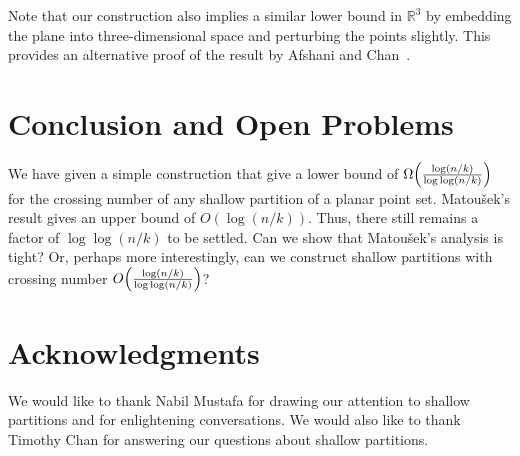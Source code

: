\documentclass{paper}
\newcommand\R{{\mathbb R}}
\newcommand\matousek{{Matou{\v{s}}ek}}
\begin{document}
Note that our construction also implies a similar lower bound in $\R^3$
by embedding the plane into three-dimensional space and perturbing
the points slightly. This provides an alternative proof of the result
by Afshani and Chan~\cite{AfshaniCh09}.

\section{Conclusion and Open Problems}

We have given a simple construction that give a lower bound
of $\Omega\Bigl(\frac{\log (n/k)}{\log\log (n/k)}\Bigr)$ for
the crossing number of
any shallow partition of a planar point set. \matousek's 
result gives an upper bound of $O(\log (n/k))$. Thus, there still
remains a factor of $\log\log(n/k)$ to be settled. Can we show that
\matousek's analysis is tight? Or, perhaps more interestingly, can
we construct shallow partitions with crossing number
$O\Bigl(\frac{\log (n/k)}{\log\log (n/k)}\Bigr)$?

\section*{Acknowledgments}

{\small
We would like to thank Nabil Mustafa for 
drawing our attention to shallow partitions
and for enlightening conversations.
We would also like to thank Timothy Chan
for answering our questions about shallow
partitions.}




\end{document}

